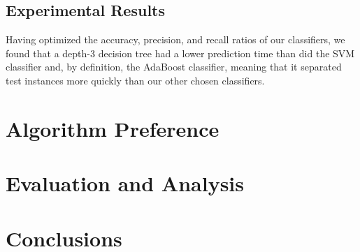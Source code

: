 \documentclass{article}
\begin{document}
\subsection{Experimental Results}

Having optimized the accuracy, precision, and recall ratios of our classifiers, we found that a depth-3 decision tree had a lower prediction time than did the SVM classifier and, by definition, the AdaBoost classifier, meaning that it separated test instances more quickly than our other chosen classifiers. 

\section{Algorithm Preference}

\section{Evaluation and Analysis}

\section{Conclusions}



\end{document}
